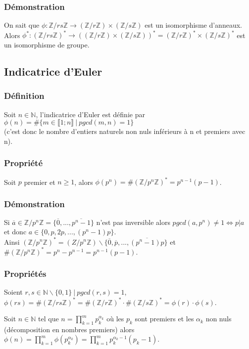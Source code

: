 \documentclass[a4paper,10pt]{book} %
\newcommand{\N}{\mathbb{N}}
\newcommand{\Z}{\mathbb{Z}}
\newcommand{\tq}{~|~}
\begin{document}
\subsubsection{Démonstration}
On sait que $\phi : \Z/rs\Z \rightarrow (\Z/r\Z) \times (\Z/s\Z)$ est un isomorphisme d'anneaux.\\
Alors $\phi^* : (\Z/rs\Z)^*\rightarrow ((\Z/r\Z)\times (\Z/s\Z))^*=(\Z/r\Z)^* \times (\Z/s\Z)^*$ est un isomorphisme de groupe.

\subsection{Indicatrice d'Euler}
\subsubsection{Définition}
Soit $n\in\N$, l'indicatrice d'Euler est définie par $\phi(n)=\#\{m\in \llbracket 1;n \rrbracket \tq pgcd(m,n)=1\}$\\(c'est donc le nombre d'entiers naturels non nuls inférieurs à n et premiers avec n).

\subsubsection{Propriété}
Soit $p$ premier et $n\geq 1$, alors $\phi(p^n)=\#(\Z/p^n\Z)^*=p^{n-1}(p-1)$.

\subsubsection{Démonstration}
Si $\overline{a}\in\Z/p^n\Z= \{\overline{0},...,\overline{p^n-1}\}$ n'est pas inversible alors $pgcd(a,p^n)\neq 1\Leftrightarrow p|a$\\et donc  $a\in\{0,p,2p,...,(p^n-1)p\}$.\\

Ainsi $(\Z/p^n\Z)^*=(Z/p^n\Z)\backslash \{\overline{0},\overline{p},...,\overline{(p^n-1)p}\}$ et $\#{(\Z/p^n\Z)^*}=p^n-p^{n-1}=p^{n-1}(p-1)$.

\subsubsection{Propriétés}
Soient $r,s\in\N\backslash\{0,1\} \tq pgcd(r,s)=1$, $\phi(rs)=\#(\Z/rs\Z)^*=\#(\Z/r\Z)^*\cdot \#(\Z/s\Z)^*=\phi(r)\cdot \phi(s)$.

Soit $n\in \N$ tel que $n=\prod_{k=1}^{m}p_k^{\alpha_k}$ où les $p_k$ sont premiers et les $\alpha_k$ non nuls (décomposition en nombres premiers) alors $\phi(n)=\prod_{k=1}^{m}\phi(p_k^{\alpha_k})=\prod_{k=1}^{m}p_{k}^{\alpha_k-1}(p_k-1)$.
\end{document}
